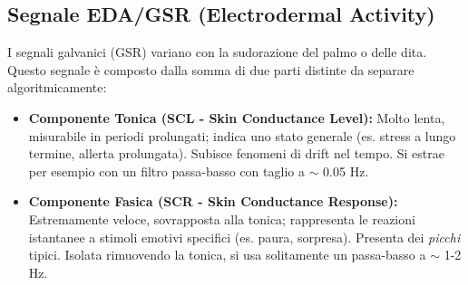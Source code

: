 \subsection{Segnale EDA/GSR (Electrodermal Activity)}
I segnali galvanici (GSR) variano con la sudorazione del palmo o delle dita.
Questo segnale è composto dalla somma di due parti distinte da separare algoritmicamente:
\begin{itemize}
    \item \textbf{Componente Tonica (SCL - Skin Conductance Level):} Molto lenta, misurabile in periodi prolungati; indica uno stato generale (es.
    stress a lungo termine, allerta prolungata).
    Subisce fenomeni di drift nel tempo.
    Si estrae per esempio con un filtro passa-basso con taglio a $\sim$ 0.05 Hz.
    \item \textbf{Componente Fasica (SCR - Skin Conductance Response):} Estremamente veloce, sovrapposta alla tonica; rappresenta le reazioni istantanee a stimoli emotivi specifici (es.
    paura, sorpresa).
    Presenta dei \emph{picchi} tipici.
    Isolata rimuovendo la tonica, si usa solitamente un passa-basso a $\sim$ 1-2 Hz.
\end{itemize}

